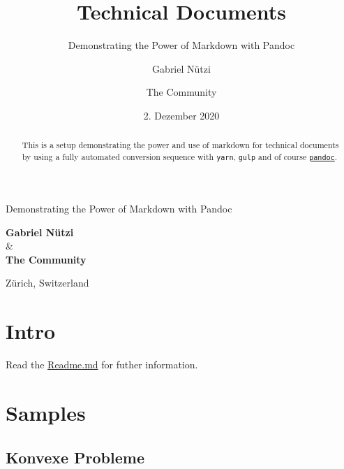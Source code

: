 \documentclass[
  12pt,
  british,
  paper=a4,
  twoside,
  titlepage=true,
  openright,
  abstract=on,
  toc=listofnumbered,
  numbers=noenddot,
  chapterprefix=true,
  headings=optiontohead,
  svgnames,
  dvipsnames]{scrreprt}
\title{Technical Documents}
\subtitle{Demonstrating the Power of Markdown with Pandoc}
\author{Gabriel Nützi \and The Community}
\date{2. Dezember 2020}
\begin{document}
\begin{titlepage}
\makeatletter
\begin{center}

\end{center}
\vspace{1cm}
\begin{center}
\Huge \textbf{\@title}
\end{center}
\begin{center}
\LARGE Demonstrating the Power of Markdown with Pandoc
\end{center}
\vspace{1cm}
\begin{center}
\textbf{Gabriel Nützi} \\ \& \\ \textbf{The Community}
\end{center}
\begin{center}
\@date
\end{center}
\begin{center}
\vfill
Zürich, Switzerland
\vspace{1cm}
\end{center}
\makeatother
\end{titlepage}\begin{abstract}
This is a setup demonstrating the power and use of markdown for
technical documents by using a fully automated conversion sequence with
\texttt{yarn}, \texttt{gulp} and of course
\href{www.pandoc.org}{\texttt{pandoc}}.
\end{abstract}

{
\hypersetup{linkcolor=Black}
\setcounter{tocdepth}{2}
\tableofcontents
}
\hypertarget{intro}{%
\chapter{Intro}\label{intro}}

Read the
\href{https://github.com/gabyx/TechnicalMarkdown/blob/master/Readme.md}{Readme.md}
for futher information.

\hypertarget{samples}{%
\chapter{Samples}\label{samples}}

\hypertarget{konvexe-probleme}{%
\section{Konvexe Probleme}\label{konvexe-probleme}}
\end{document}

